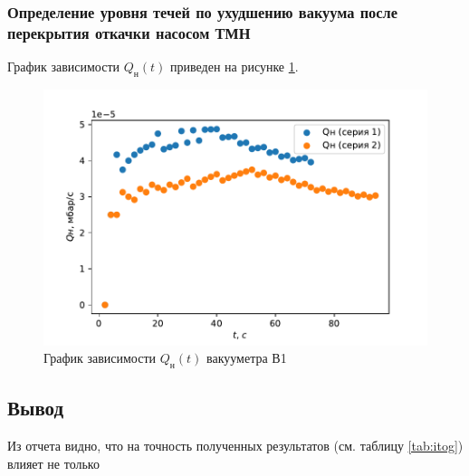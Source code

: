 \documentclass[12pt,a4paper]{article}
\begin{document}
\subsubsection*{Определение уровня течей по ухудшению вакуума после перекрытия откачки насосом ТМН}
График зависимости $Q_{\text{н}}(t)$ приведен на рисунке \ref{fig:Q(t)}. 
\begin{figure}[H]
	\caption{График зависимости $Q_{\text{н}}(t)$ вакууметра В1}
	\label{fig:Q(t)}
	\centering
	\includegraphics[width = 11 cm]{res/Q(t).pdf}
\end{figure}


\subsection*{Вывод}

Из отчета видно, что на точность полученных результатов (см. таблицу \ref{tab:itog}) влияет не только 
 
\end{document}
